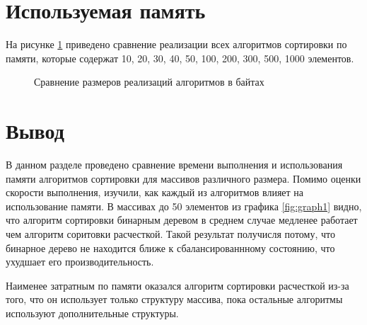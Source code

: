\section{Используемая память}
На рисунке \ref{fig:graph4} приведено сравнение реализации всех алгоритмов сортировки по памяти, которые содержат 10, 20, 30, 40, 50, 100, 200, 300, 500, 1000 элементов.
\begin{figure}[ht!]
	\begin{center}
		\captionsetup{singlelinecheck = false, justification=centerfirst}
		\centering
		\caption{Сравнение размеров реализаций алгоритмов в байтах}
		\label{fig:graph4}
	\end{center}
\end{figure}
\clearpage

\section*{Вывод}

В данном разделе проведено сравнение времени выполнения и использования памяти алгоритмов сортировки для массивов различного размера. 
Помимо оценки скорости выполнения, изучили, как каждый из алгоритмов влияет на использование памяти. 
В массивах до 50 элементов из графика \ref{fig:graph1} видно, что алгоритм сортировки бинарным деревом в среднем случае медленее работает чем алгоритм соритовки расчесткой. 
Такой результат получисля потому, что бинарное дерево не находится ближе к сбалансированнному состоянию, что ухудшает его производительность.

Наименее затратным по памяти оказался алгоритм сортировки расчесткой из-за того, что он использует только структуру массива, пока остальные алгоритмы используют дополнительные структуры.

